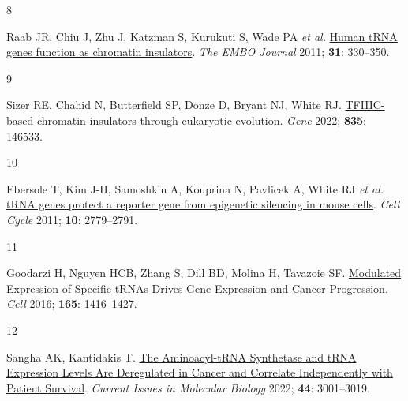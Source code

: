 \documentclass[
  12pt,
]{article}
\newlength{\cslhangindent}
\newlength{\csllabelwidth}
\newlength{\cslentryspacingunit} %
\newenvironment{CSLReferences}[2] %
 {%
  \setlength{\parindent}{0pt}
  \ifodd #1
  \let\oldpar\par
  \def\par{\hangindent=\cslhangindent\oldpar}
  \fi
  \setlength{\parskip}{#2\cslentryspacingunit}
 }%
 {}
\newcommand{\CSLLeftMargin}[1]{\parbox[t]{\csllabelwidth}{#1}}
\newcommand{\CSLRightInline}[1]{\parbox[t]{\linewidth - \csllabelwidth}{#1}\break}
\begin{document}
\begin{CSLReferences}{0}{0}
\leavevmode{}%
\CSLLeftMargin{8 }%
\CSLRightInline{Raab JR, Chiu J, Zhu J, Katzman S, Kurukuti S, Wade PA \emph{et al.} \href{https://doi.org/10.1038/emboj.2011.406}{Human tRNA genes function as chromatin insulators}. \emph{The EMBO Journal} 2011; \textbf{31}: 330--350.}

\leavevmode{}%
\CSLLeftMargin{9 }%
\CSLRightInline{Sizer RE, Chahid N, Butterfield SP, Donze D, Bryant NJ, White RJ. \href{https://doi.org/10.1016/j.gene.2022.146533}{TFIIIC-based chromatin insulators through eukaryotic evolution}. \emph{Gene} 2022; \textbf{835}: 146533.}

\leavevmode{}%
\CSLLeftMargin{10 }%
\CSLRightInline{Ebersole T, Kim J-H, Samoshkin A, Kouprina N, Pavlicek A, White RJ \emph{et al.} \href{https://doi.org/10.4161/cc.10.16.17092}{tRNA genes protect a reporter gene from epigenetic silencing in mouse cells}. \emph{Cell Cycle} 2011; \textbf{10}: 2779--2791.}

\leavevmode{}%
\CSLLeftMargin{11 }%
\CSLRightInline{Goodarzi H, Nguyen HCB, Zhang S, Dill BD, Molina H, Tavazoie SF. \href{https://doi.org/10.1016/j.cell.2016.05.046}{Modulated Expression of Specific tRNAs Drives Gene Expression and Cancer Progression}. \emph{Cell} 2016; \textbf{165}: 1416--1427.}

\leavevmode{}%
\CSLLeftMargin{12 }%
\CSLRightInline{Sangha AK, Kantidakis T. \href{https://doi.org/10.3390/cimb44070207}{The Aminoacyl-tRNA Synthetase and tRNA Expression Levels Are Deregulated in Cancer and Correlate Independently with Patient Survival}. \emph{Current Issues in Molecular Biology} 2022; \textbf{44}: 3001--3019.}

\end{CSLReferences}
\end{document}
